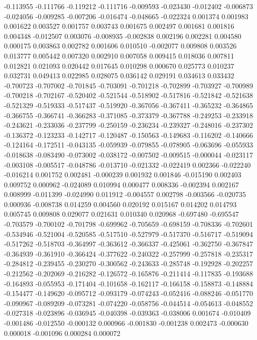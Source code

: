-0.113955
-0.111766
-0.119212
-0.111716
-0.009593
-0.023430
-0.012402
-0.006873
-0.024056
-0.009285
-0.007206
-0.016474
-0.048665
-0.022324
0.001374
0.001983
0.001622
0.003527
0.001757
0.003743
0.001675
0.002497
0.001681
0.001816
0.004348
-0.012507
0.003076
-0.008935
-0.002838
0.002196
0.002281
0.004580
0.000175
0.003863
0.002782
0.001606
0.010510
-0.002077
0.009808
0.003526
0.013777
0.005442
0.007320
0.002910
0.007058
0.009415
0.018036
0.007811
0.012821
0.021093
0.020442
0.017645
0.010298
0.000670
0.025773
0.010237
0.032731
0.049413
0.022985
0.028075
0.036142
0.029191
0.034613
0.033432
-0.700723
-0.707002
-0.701845
-0.703091
-0.701218
-0.702899
-0.703927
-0.700989
-0.700218
-0.702167
-0.520402
-0.521544
-0.518902
-0.517816
-0.521842
-0.521638
-0.521329
-0.519333
-0.517437
-0.519920
-0.367056
-0.367411
-0.365232
-0.364865
-0.366755
-0.366741
-0.366283
-0.371085
-0.373379
-0.367788
-0.249253
-0.233918
-0.243621
-0.233036
-0.237799
-0.250159
-0.236234
-0.239327
-0.248016
-0.237302
-0.136372
-0.123233
-0.142717
-0.120487
-0.150563
-0.149683
-0.116202
-0.140666
-0.124164
-0.172511
-0.043135
-0.059939
-0.079855
-0.078905
-0.063696
-0.055933
-0.018638
-0.083490
-0.073002
-0.038172
-0.007502
-0.009515
-0.000044
-0.023117
-0.003108
-0.005517
-0.048786
-0.013710
-0.021332
-0.022419
0.002366
-0.022240
-0.016214
0.001752
0.002481
-0.000239
0.001932
0.001846
-0.015190
0.002403
0.009752
0.000962
-0.024089
0.010994
0.000477
0.008336
-0.002394
0.002167
0.008999
-0.011399
-0.024990
0.011912
-0.004557
0.002798
-0.003566
-0.020735
0.000936
-0.008738
0.014259
0.004560
0.020192
0.015167
0.014202
0.014793
0.005745
0.009808
0.029077
0.021631
0.010340
0.020968
-0.697480
-0.695547
-0.703579
-0.700102
-0.701798
-0.699962
-0.705659
-0.698159
-0.708336
-0.702601
-0.534946
-0.521004
-0.520585
-0.517510
-0.527979
-0.517370
-0.516717
-0.519094
-0.517262
-0.518703
-0.364997
-0.363612
-0.366337
-0.425061
-0.362750
-0.367847
-0.364939
-0.361910
-0.366424
-0.377622
-0.240322
-0.257999
-0.257818
-0.235317
-0.284812
-0.239455
-0.230270
-0.300562
-0.243633
-0.285748
-0.192928
-0.202257
-0.212562
-0.202069
-0.216282
-0.126572
-0.165876
-0.211414
-0.117835
-0.193688
-0.164893
-0.055953
-0.171404
-0.101658
-0.162117
-0.166158
-0.158873
-0.148884
-0.154477
-0.149620
-0.095712
-0.093179
-0.074243
-0.052416
-0.088246
-0.051770
-0.090967
-0.089209
-0.073281
-0.074220
-0.058756
-0.044514
-0.054613
-0.048552
-0.027318
-0.023896
-0.036945
-0.040398
-0.039363
-0.038006
0.001674
-0.010409
-0.001486
-0.012550
-0.000132
0.000966
-0.001830
-0.001238
0.002473
-0.000630
0.000018
-0.001096
0.000284
0.000072

